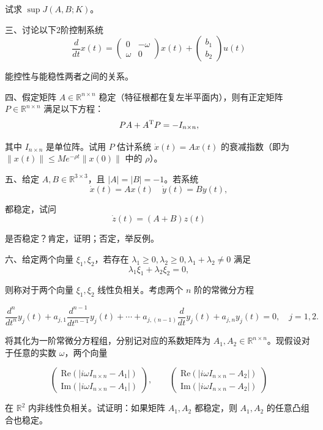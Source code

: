 试求 \(\sup J(A, B; K)\)。

三、讨论以下$2$阶控制系统  
\[\frac{d}{dt} x(t) = \begin{pmatrix} 0 & -\omega \\ \omega & 0 \end{pmatrix} x(t) + \begin{pmatrix} b_1 \\ b_2 \end{pmatrix} u(t)\]

能控性与能稳性两者之间的关系。

四、假定矩阵 \( A \in \mathbb{R}^{n \times n} \) 稳定（特征根都在复左半平面内），则有正定矩阵 \( P \in \mathbb{R}^{n \times n} \) 满足以下方程：  
\[PA + A^{\rm T} P = -I_{n \times n},\]

其中 \( I_{n \times n} \) 是单位阵。试用 \( P \) 估计系统 \( \dot{x}(t) = Ax(t) \) 的衰减指数（即为 \(\|x(t)\| \leq Me^{-\rho t} \|x(0)\|\) 中的 \(\rho\)）。

五、给定 \( A, B \in \mathbb{R}^{3 \times 3} \)，且 \( |A| = |B| = -1 \)。若系统  
\[\dot{x}(t) = Ax(t) \quad \dot{y}(t) = By(t),\]

都稳定，试问  
\[\dot{z}(t) = (A + B)z(t)\]

是否稳定？肯定，证明；否定，举反例。

六、给定两个向量 \(\xi_1, \xi_2\)，若存在 \(\lambda_1 \geq 0, \lambda_2 \geq 0, \lambda_1 + \lambda_2 \neq 0\) 满足  
\[\lambda_1 \xi_1 + \lambda_2 \xi_2 = 0,\]

则称对于两个向量 \(\xi_1, \xi_2\) 线性负相关。考虑两个 \( n \) 阶的常微分方程

\[\frac{d^n}{dt^n}y_j(t) + a_{j,1}\frac{d^{n-1}}{dt^{n-1}}y_j(t) + \cdots + a_{j,(n-1)}\frac{d}{dt}y_j(t) + a_{j,n}y_j(t) = 0, \quad j=1,2.\]

将其化为一阶常微分方程组，分别记对应的系数矩阵为 \(A_1, A_2 \in \mathbb{R}^{n \times n}\)。现假设对于任意的实数 \(\omega\)，两个向量

\[\begin{pmatrix}
\text{Re}(|i\omega I_{n \times n} - A_1|) \\
\text{Im}(|i\omega I_{n \times n} - A_1|)
\end{pmatrix}, \qquad \begin{pmatrix}
\text{Re}(|i\omega I_{n \times n} - A_2|) \\
\text{Im}(|i\omega I_{n \times n} - A_2|)
\end{pmatrix}\]

在 \(\mathbb{R}^2\) 内非线性负相关。试证明：如果矩阵 \(A_1, A_2\) 都稳定，则 \(A_1, A_2\) 的任意凸组合也稳定。

